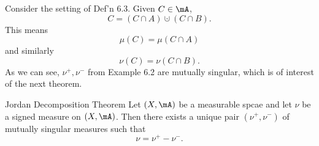 \documentclass[pmath451]{subfiles}
\begin{document}
    \np Consider the setting of Def'n 6.3. Given $C\in\mA$,
    \begin{equation*}
        C = \left( C\cap A \right)\cupdot\left( C\cap B \right).
    \end{equation*}
    This means
    \begin{equation*}
        \mu\left( C \right) = \mu\left( C\cap A \right)
    \end{equation*}
    and similarly
    \begin{equation*}
        \nu\left( C \right) = \nu\left( C\cap B \right).
    \end{equation*}
    As we can see, $\nu^+,\nu^-$ from Example 6.2 are mutually singular, which is of interest of the next theorem.

    \begin{theorem}{Jordan Decomposition Theorem}
        Let $\left( X,\mA \right)$ be a measurable spcae and let $\nu$ be a signed measure on $\left( X,\mA \right)$. Then there exists a unique pair $\left( \nu^+,\nu^- \right)$ of mutually singular measures such that
        \begin{equation*}
            \nu = \nu^+-\nu^-.
        \end{equation*}
    \end{theorem}
    
\end{document}
